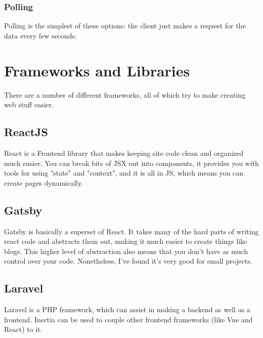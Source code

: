 \documentclass[a4paper,12pt,titlepage,oneside,final]{book}
\begin{document}
\subsection{Polling}
Polling is the simplest of these options: the client just makes a request for the data every few seconds.

\chapter{Frameworks and Libraries}

There are a number of different frameworks, all of which try to make creating web stuff easier.

\section{ReactJS}
React is a Frontend library that makes keeping site code clean and organized much easier. You can break bits of JSX out into components, it provides you with tools for using "state" and "context", and it is all in JS, which means you can create pages dynamically.  

\section{Gatsby}
Gatsby is basically a superset of React. It takes many of the hard parts of writing react code and abstracts them out, making it much easier to create things like blogs. This higher level of abstraction also means that you don't have as much control over your code. Nonetheless, I've found it's very good for small projects. 

\section{Laravel}
Laravel is a PHP framework, which can assist in making a backend as well as a frontend. Inertia can be used to couple other frontend frameworks (like Vue and React) to it.
\end{document}

